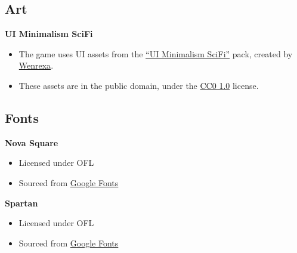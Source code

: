 \documentclass[10pt]{article}
\begin{document}
\subsection{Art}

\textbf{UI Minimalism SciFi}
\begin{itemize}
    \item The game uses UI assets from the \href{https://opengameart.org/content/assets-ui-minimalism-scifi}{``UI Minimalism SciFi''} pack,
        created by \href{https://wenrexa.itch.io/}{Wenrexa}.
    \item These assets are in the public domain, under the \href{https://creativecommons.org/publicdomain/zero/1.0/}{CC0 1.0} license.
\end{itemize}

\subsection{Fonts}

\textbf{Nova Square}
\begin{itemize}
    \item Licensed under OFL
    \item Sourced from \href{https://fonts.google.com/specimen/Nova+Square}{Google Fonts}
\end{itemize}

\textbf{Spartan}
\begin{itemize}
    \item Licensed under OFL
    \item Sourced from \href{https://fonts.google.com/specimen/Spartan}{Google Fonts}
\end{itemize}


\end{document}
